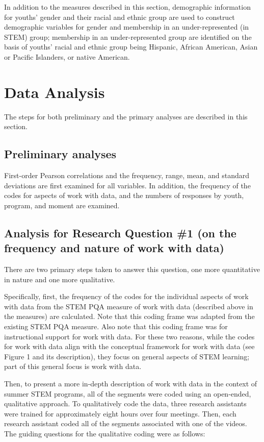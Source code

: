 \documentclass[]{msu-thesis}
\theoremstyle{definition}
\theoremstyle{definition}
\theoremstyle{definition}
\theoremstyle{remark}
\begin{document}
In addition to the measures described in this section, demographic
information for youths' gender and their racial and ethnic group are
used to construct demographic variables for gender and membership in an
under-represented (in STEM) group; membership in an under-represented
group are identified on the basis of youths' racial and ethnic group
being Hispanic, African American, Asian or Pacific Islanders, or native
American.

\section{Data Analysis}\label{data-analysis}

The steps for both preliminary and the primary analyses are described in
this section.

\subsection{Preliminary analyses}\label{preliminary-analyses}

First-order Pearson correlations and the frequency, range, mean, and
standard deviations are first examined for all variables. In addition,
the frequency of the codes for aspects of work with data, and the
numbers of responses by youth, program, and moment are examined.

\subsection{Analysis for Research Question \#1 (on the frequency and
nature of work with
data)}\label{analysis-for-research-question-1-on-the-frequency-and-nature-of-work-with-data}

There are two primary steps taken to answer this question, one more
quantitative in nature and one more qualitative.

Specifically, first, the frequency of the codes for the individual
aspects of work with data from the STEM PQA measure of work with data
(described above in the measures) are calculated. Note that this coding
frame was adapted from the existing STEM PQA measure. Also note that
this coding frame was for instructional support for work with data. For
these two reasons, while the codes for work with data align with the
conceptual framework for work with data (see Figure 1 and its
description), they focus on general aspects of STEM learning; part of
this general focus is work with data.

Then, to present a more in-depth description of work with data in the
context of summer STEM programs, all of the segments were coded using an
open-ended, qualitative approach. To qualitatively code the data, three
research assistants were trained for approximately eight hours over four
meetings. Then, each research assistant coded all of the segments
associated with one of the videos. The guiding questions for the
qualitative coding were as follows:
\end{document}
